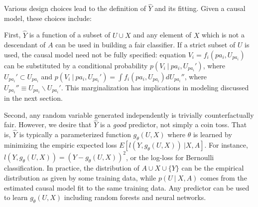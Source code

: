 Various design choices lead to the definition of $\hat Y$ and its fitting. Given a causal model, these choices include:%

First, $\hat Y$ is a function of a subset of $U \cup X$ and any
element of $X$ which is not a descendant of $A$ can be used in
building a fair classifier. If a strict subset of $U$ is used, the
causal model need not be fully specified: equation
$V_i = f_i(pa_i, U_{pa_i})$ can be substituted by a conditional
probability $p(V_i\ |\ pa_i, U_{pa_i}')$, where
$U_{pa_i}' \subset U_{pa_i}$ and
$p(V_i\ |\ pa_i, U_{pa_i}') = \int f_i(pa_i, U_{pa_i}) d U_{pa_i}''$,
where $U_{pa_i}'' \equiv U_{pa_i} \backslash U_{pa_i}'$. This
marginalization has implications in modeling discussed in the next
section.

Second, any random variable generated independently is trivially
counterfactually fair. However, we desire that $\hat Y$ is a {\it
  good} predictor, not simply a coin toss. That is,
$\hat Y$ is typically a parameterized function
$g_\theta(U, X)$ where $\theta$ is learned by minimizing the empiric
expected loss $E[l(Y, g_\theta(U, X))\ | X, A].$%
For instance, $l(Y, g_\theta(U, X)) = (Y - g_\theta(U, X))^2$, or the
log-loss for Bernoulli classification.  In practice, the distribution
of $A \cup X \cup \{Y\}$ can be the empirical distribution as given by
some training data, while $p(U\ |\ X, A)$ comes from the estimated
causal model fit to the same training data. %
Any predictor can be used to learn $g_\theta(U, X)$
including random forests and neural networks.

